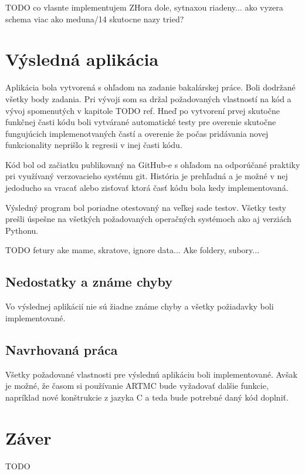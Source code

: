TODO co vlasnte implementujem ZHora dole, sytnaxou riadeny... ako vyzera schema viac ako meduna/14 skutocne nazy tried?

\chapter{Výsledná aplikácia}
Aplikácia bola vytvorená s ohľadom na zadanie bakalárskej práce. Boli dodržané všetky body zadania. Pri vývoji som sa držal požadovaných vlastností na kód a vývoj spomenutých v kapitole TODO ref. Hneď po vytvorení prvej skutočne funkčnej časti kódu boli vytvárané automatické testy pre overenie skutočne fungujúcich implemenotvaných častí a overenie že počas pridávania novej funkcionality neprišlo k regresii v inej časti kódu. 

Kód bol od začiatku publikovaný na GitHub-e s ohľadom na odporúčané praktiky pri využívaný verzovacieho systému git. História je prehľadná a je možné v nej jedoducho sa vracať alebo zisťovať ktorá časť kódu bola kedy implementovaná.

Výsledný program bol poriadne otestovaný na veľkej sade testov. Všetky testy prešli úspešne na všetkých požadovaných operačných systémoch ako aj verziách Pythonu.

TODO fetury ake mame, skratove, ignore data...
Ake foldery, subory...

\section{Nedostatky a známe chyby}
Vo výslednej aplikácií nie sú žiadne známe chyby a všetky požiadavky boli implementované.

\section{Navrhovaná práca}
Všetky požadované vlastnosti pre výslednú aplikáciu boli implementované. Avšak je možné, že časom si používanie ARTMC bude vyžadovať dalšie funkcie, napríklad nové konštrukcie z jazyka C a teda bude potrebné daný kód doplniť. 

\chapter{Záver}
TODO
